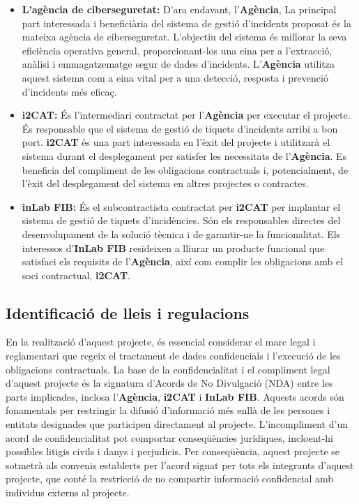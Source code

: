\begin{itemize}
    \item \textbf{L'agència de ciberseguretat:} D'ara endavant, l'\textbf{Agència}, La principal part interessada i beneficiària del sistema de gestió d'incidents proposat és la mateixa agència de ciberseguretat. L'objectiu del sistema és millorar la seva eficiència operativa general, proporcionant-los una eina per a l'extracció, anàlisi i emmagatzematge segur de dades d'incidents. L'\textbf{Agència} utilitza aquest sistema com a eina vital per a una detecció, resposta i prevenció d'incidents més eficaç.
    \item \textbf{i2CAT:} És l'intermediari contractat per l'\textbf{Agència} per executar el projecte. És responsable que el sistema de gestió de tiquets d'incidents arribi a bon port. \textbf{i2CAT} és una part interessada en l'èxit del projecte i utilitzarà el sistema durant el desplegament per satisfer les necessitats de l'\textbf{Agència}. Es beneficia del compliment de les obligacions contractuals i, potencialment, de l'èxit del desplegament del sistema en altres projectes o contractes.
     \item \textbf{inLab FIB:} És el subcontractista contractat per \textbf{i2CAT} per implantar el sistema de gestió de tiquets d'incidències. Són els responsables directes del desenvolupament de la solució tècnica i de garantir-ne la funcionalitat. Els interessos d'\textbf{InLab FIB} resideixen a lliurar un producte funcional que satisfaci els requisits de l'\textbf{Agència}, així com complir les obligacions amb el soci contractual, \textbf{i2CAT}.
\end{itemize}


\subsection{Identificació de lleis i regulacions}
En la realització d'aquest projecte, és essencial considerar el marc legal i reglamentari que regeix el tractament de dades confidencials i l'execució de les obligacions contractuals. La base de la confidencialitat i el compliment legal d'aquest projecte és la signatura d'Acords de No Divulgació (NDA) entre les parts implicades, inclosa l'\textbf{Agència}, \textbf{i2CAT} i \textbf{InLab FIB}. 
Aquests acords són fonamentals per restringir la difusió d'informació més enllà de les persones i entitats designades que participen directament al projecte. L'incompliment d'un acord de confidencialitat pot comportar conseqüències jurídiques, incloent-hi possibles litigis civils i danys i perjudicis. Per conseqüència, aquest projecte se sotmetrà als convenis establerts per l'acord signat per tots els integrants d'aquest projecte, que conté la restricció de no compartir informació confidencial amb individus externs al projecte.

